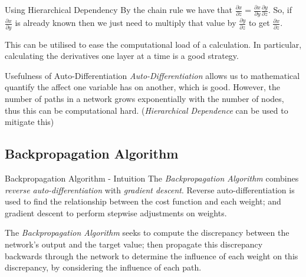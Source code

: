 \documentclass[11pt,a4paper]{article}
\begin{document}
\begin{proposition}{Using Hierarchical Dependency}
  By the chain rule we have that $\frac{\partial x}{\partial z}=\frac{\partial x}{\partial y}\frac{\partial y}{\partial z}$. So, if $\frac{\partial x}{\partial y}$ is already known then we just need to multiply that value by $\frac{\partial y}{\partial z}$ to get $\frac{\partial x}{\partial z}$.
  \par This can be utilised to ease the computational load of a calculation. In particular, calculating the derivatives one layer at a time is a good strategy.
\end{proposition}

\begin{remark}{Usefulness of Auto-Differentiation}
  \textit{Auto-Differentiation} allows us to mathematical quantify the affect one variable has on another, which is good. However, the number of paths in a network grows exponentially with the number of nodes, thus this can be computational hard. (\textit{Hierarchical Dependence} can be used to mitigate this)
\end{remark}

\subsection{Backpropagation Algorithm}

\begin{remark}{Backpropagation Algorithm - Intuition}
  The \textit{Backpropagation Algorithm} combines \textit{reverse auto-differentiation} with \textit{gradient descent}. Reverse auto-differentiation is used to find the relationship between the cost function and each weight; and gradient descent to perform stepwise adjustments on weights.
  \par The \textit{Backpropagation Algorithm} seeks to compute the discrepancy between the network's output and the target value; then propagate this discrepancy backwards through the network to determine the influence of each weight on this discrepancy, by considering the influence of each path.
\end{remark}
\end{document}
